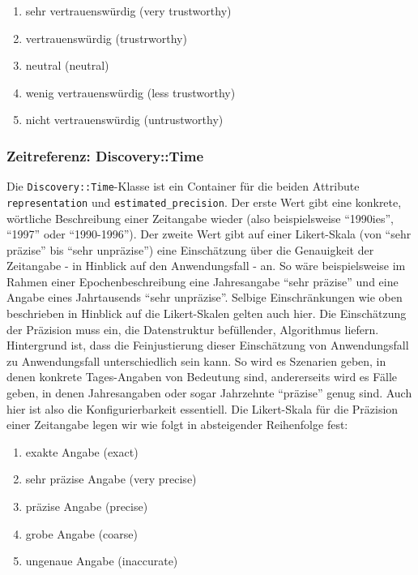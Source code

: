 \begin{enumerate}
  \item sehr vertrauenswürdig (very trustworthy)
  \item vertrauenswürdig (trustrworthy)
  \item neutral (neutral)
  \item wenig vertrauenswürdig (less trustworthy)
  \item nicht vertrauenswürdig (untrustworthy)
\end{enumerate}

\subsubsection{Zeitreferenz: Discovery::Time}
Die \texttt{Discovery::Time}-Klasse ist ein Container für die beiden Attribute \texttt{representation} und \texttt{estimated\_precision}. Der erste Wert gibt eine konkrete, wörtliche Beschreibung einer Zeitangabe wieder (also beispielsweise ``1990ies'', ``1997'' oder ``1990-1996''). Der zweite Wert gibt auf einer Likert-Skala (von ``sehr präzise'' bis ``sehr unpräzise'') eine Einschätzung über die Genauigkeit der Zeitangabe - in Hinblick auf den Anwendungsfall - an. So wäre beispielsweise im Rahmen einer Epochenbeschreibung eine Jahresangabe ``sehr präzise'' und eine Angabe eines Jahrtausends ``sehr unpräzise''. Selbige Einschränkungen wie oben beschrieben in Hinblick auf die Likert-Skalen gelten auch hier. Die Einschätzung der Präzision muss ein, die Datenstruktur befüllender, Algorithmus liefern. Hintergrund ist, dass die Feinjustierung dieser Einschätzung von Anwendungsfall zu Anwendungsfall unterschiedlich sein kann. So wird es Szenarien geben, in denen konkrete Tages-Angaben von Bedeutung sind, andererseits wird es Fälle geben, in denen Jahresangaben oder sogar Jahrzehnte ``präzise'' genug sind. Auch hier ist also die Konfigurierbarkeit essentiell. Die Likert-Skala für die Präzision einer Zeitangabe legen wir wie folgt in absteigender Reihenfolge fest:

\begin{enumerate}
  \item exakte Angabe (exact)
  \item sehr präzise Angabe (very precise)
  \item präzise Angabe (precise)
  \item grobe Angabe (coarse)
  \item ungenaue Angabe (inaccurate)
\end{enumerate}

